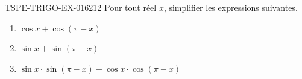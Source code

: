 \begin{exercice}{TSPE-TRIGO-EX-016}{2}{12}
Pour tout réel $x$, simplifier les expressions suivantes.
\begin{enumerate}
  \item $\cos x + \cos(\pi - x)$
  \item $\sin x + \sin(\pi - x)$
  \item $\sin x \cdot \sin(\pi - x) + \cos x \cdot \cos(\pi - x)$
\end{enumerate}
\end{exercice}
